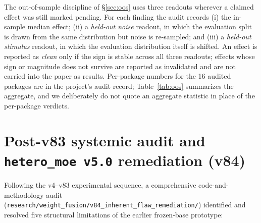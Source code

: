 \documentclass[10pt]{article}
\theoremstyle{definition}
\theoremstyle{plain}
\theoremstyle{remark}
\begin{document}
The out-of-sample discipline of \S\ref{sec:oos} uses three readouts wherever a claimed effect was still marked pending. For each finding the audit records (i) the in-sample median effect; (ii) a \emph{held-out noise} readout, in which the evaluation split is drawn from the same distribution but noise is re-sampled; and (iii) a \emph{held-out stimulus} readout, in which the evaluation distribution itself is shifted. An effect is reported as \emph{clean} only if the sign is stable across all three readouts; effects whose sign or magnitude does not survive are reported as invalidated and are not carried into the paper as results. Per-package numbers for the 16 audited packages are in the project's audit record; Table~\ref{tab:oos} summarizes the aggregate, and we deliberately do not quote an aggregate statistic in place of the per-package verdicts.

\section{Post-v83 systemic audit and \texttt{hetero\_moe v5.0} remediation (v84)}
\label{app:v84}

Following the v4--v83 experimental sequence, a comprehensive code-and-methodology audit (\texttt{research/weight\_fusion/v84\_inherent\_flaw\_remediation/}) identified and resolved five structural limitations of the earlier frozen-base prototype:
\end{document}
